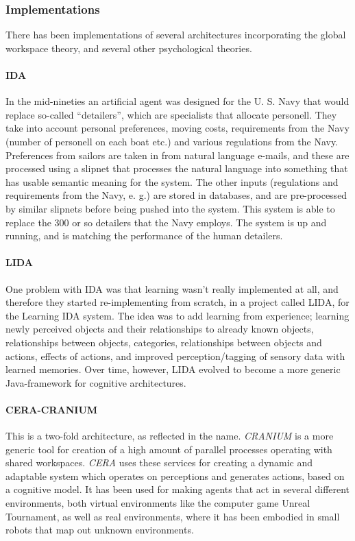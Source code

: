 \subsubsection{Implementations}
There has been implementations of several architectures incorporating the global workspace theory, and several other psychological theories.

\paragraph{IDA}
In the mid-nineties an artificial agent was designed for the U. S. Navy that would replace so-called ``detailers'', which are specialists that allocate personell. They take into account personal preferences, moving costs, requirements from the Navy (number of personell on each boat etc.) and various regulations from the Navy. Preferences from sailors are taken in from natural language e-mails, and these are processed using a slipnet that processes the natural language into something that has usable semantic meaning for the system. The other inputs (regulations and requirements from the Navy, e. g.) are stored in databases, and are pre-processed by similar slipnets before being pushed into the system. This system is able to replace the 300 or so detailers that the Navy employs. The system is up and running, and is matching the performance of the human detailers. \cite{baars2007architectural}\cite{franklin1998ida}

\paragraph{LIDA}
One problem with IDA was that learning wasn't really implemented at all, and therefore they started re-implementing from scratch, in a project called LIDA, for the Learning IDA system. The idea was to add learning from experience; learning newly perceived objects and their relationships to already known objects, relationships between objects, categories, relationships between objects and actions, effects of actions, and improved perception/tagging of sensory data with learned memories.\cite{franklin2006lida} Over time, however, LIDA evolved to become a more generic Java-framework for cognitive architectures.\cite{snaider2011lida}

\paragraph{CERA-CRANIUM}
This is a two-fold architecture, as reflected in the name. {\em CRANIUM} is a more generic tool for creation of a high amount of parallel processes operating with shared workspaces. {\em CERA} uses these services for creating a dynamic and adaptable system which operates on perceptions and generates actions, based on a cognitive model.\cite{arrabales2009gamechars} It has been used for making agents that act in several different environments, both virtual environments like the computer game Unreal Tournament, as well as real environments, where it has been embodied in small robots that map out unknown environments. \cite{arrabales2009ceracranium}

